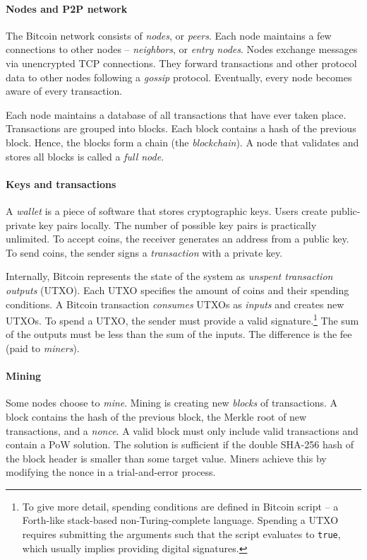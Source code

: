\paragraph{Nodes and P2P network}

The Bitcoin network consists of \textit{nodes}, or \textit{peers}.
Each node maintains a few connections to other nodes -- \textit{neighbors}, or \textit{entry nodes}.
Nodes exchange messages via unencrypted TCP connections.
They forward transactions and other protocol data to other nodes following a \textit{gossip} protocol.
Eventually, every node becomes aware of every transaction.

Each node maintains a database of all transactions that have ever taken place.
Transactions are grouped into blocks.
Each block contains a hash of the previous block.
Hence, the blocks form a chain (the \textit{blockchain}).
A node that validates and stores all blocks is called a \textit{full node}.

\paragraph{Keys and transactions}

A \textit{wallet} is a piece of software that stores cryptographic keys.
Users create public-private key pairs locally.
The number of possible key pairs is practically unlimited.
To accept coins, the receiver generates an address from a public key.
To send coins, the sender signs a \textit{transaction} with a private key.

Internally, Bitcoin represents the state of the system as \textit{unspent transaction outputs} (UTXO).
Each UTXO specifies the amount of coins and their spending conditions.
A Bitcoin transaction \textit{consumes} UTXOs as \textit{inputs} and creates new UTXOs.
To spend a UTXO, the sender must provide a valid signature.\footnote{To give more detail, spending conditions are defined in Bitcoin script -- a Forth-like stack-based non-Turing-complete language.
Spending a UTXO requires submitting the arguments such that the script evaluates to \texttt{true}, which usually implies providing digital signatures.}
The sum of the outputs must be less than the sum of the inputs.
The difference is the fee (paid to \textit{miners}).

\paragraph{Mining}

Some nodes choose to \textit{mine}.
Mining is creating new \textit{blocks} of transactions.
A block contains the hash of the previous block, the Merkle root of new transactions, and a \textit{nonce}.
A valid block must only include valid transactions and contain a PoW solution.
The solution is sufficient if the double SHA-256 hash of the block header is smaller than some target value.
Miners achieve this by modifying the nonce in a trial-and-error process.

